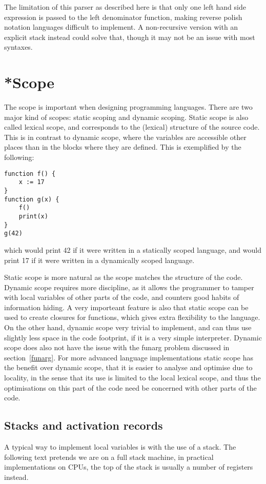 The limitation of this parser as described here is that only one left hand side expression is passed to the left denominator function, making reverse polish notation languages difficult to implement. A non-recursive version with an explicit stack instead could solve that, though it may not be an issue with most syntaxes. 

\section{*Scope}
The scope is important when designing programming languages.
There are two major kind of scopes: static scoping and dynamic scoping.
Static scope is also called lexical scope, and corresponds to the (lexical) structure of the source code.
This is in contrast to dynamic scope, where the variables are accessible other places than in the blocks where they are defined. This is exemplified by the following:
\begin{verbatim}
function f() {
    x := 17
}
function g(x) {
    f()
    print(x)
}
g(42)
\end{verbatim}
which would print 42 if it were written in a statically scoped language, and would print 17 if it were written in a dynamically scoped language.

Static scope is more natural as the scope matches the structure of the code. Dynamic scope requires more discipline, as it allows the programmer to tamper with local variables of other parts of the code, and counters good habits of information hiding. A very importeant feature is also that static scope can be used to create closures for functions, which gives extra flexibility to the language.
On the other hand, dynamic scope very trivial to implement, and can thus use slightly less space in the code footprint, if it is a very simple interpreter. Dynamic scope does also not have the issue with the funarg problem discussed in section~\ref{funarg}.
For more advanced language implementations static scope has the benefit over dynamic scope, that it is easier to analyse and optimise due to locality, in the sense that its use is limited to the local lexical scope, and thus the optimisations on this part of the code need be concerned with other parts of the code.

\subsection{Stacks and activation records}
A typical way to implement local variables is with the use of a stack.
The following text pretends we are on a full stack machine, 
in practical implementations on CPUs, the top of the stack is usually a number of registers instead.

